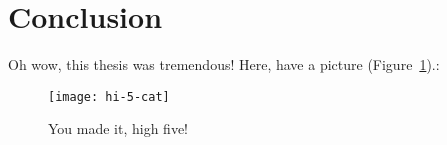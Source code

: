 \documentclass[../thesis.tex]{subfiles}
\begin{document}
\chapter*{Conclusion}
Oh wow, this thesis was tremendous! Here, have a picture (Figure~\ref{fig:cat}).:

\begin{figure}[h]
  \centering
  \texttt{[image: hi-5-cat]}
  \caption{You made it, high five!}
  \label{fig:cat}
\end{figure}

\biblio
\end{document}
